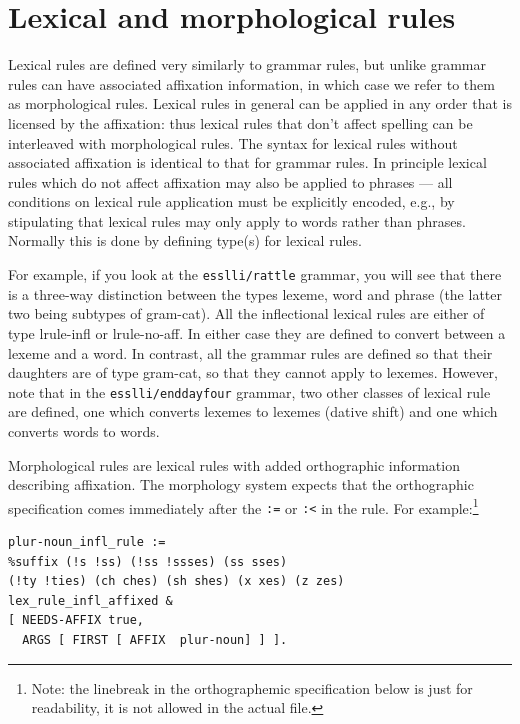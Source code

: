 \documentclass[12pt]{report}
\newcommand{\filename}[1]{{\tt #1}}
\begin{document}
\section{Lexical and morphological rules}
\label{lrules}

Lexical rules are defined very similarly to grammar rules, but 
unlike grammar rules can have associated affixation information,
in which case we refer to them as morphological rules.
Lexical rules in general can be applied in any order that is
licensed by the affixation: thus lexical rules that don't
affect spelling can be interleaved with morphological rules.
The syntax for lexical rules without associated affixation
is identical to that for grammar rules.
In principle
lexical rules which do not affect affixation
may also be applied to phrases ---
all conditions on lexical rule application must be explicitly encoded,
e.g., by stipulating that lexical rules may only apply
to {\type word}s rather than {\type phrase}s.
Normally this is done by defining type(s) for lexical rules.

For example, if you look at the \filename{esslli/rattle} 
grammar, you will see that
there is a three-way distinction between the types {\type lexeme},
{\type word} and {\type phrase} (the latter two being subtypes of
{\type gram-cat}).
All the inflectional lexical rules
are either of type {\type lrule-infl} or {\type lrule-no-aff}.  In either
case they are defined to convert between a {\type lexeme} and a {\type word}.
In contrast, all the grammar rules are defined so that their daughters
are of type {\type gram-cat}, so that they cannot apply to lexemes.
However, note that in the \filename{esslli/enddayfour} grammar, two other classes
of lexical rule are defined, one which converts {\type lexeme}s to 
{\type lexeme}s (dative shift) and one which converts {\type word}s to
{\type word}s.  

Morphological rules are lexical
rules with added orthographic
information describing affixation.
The morphology system expects that the
orthographic specification comes immediately after the 
{\tt :=} or {\tt :<} in the rule.
For example:\footnote{Note: the linebreak 
in the orthographemic specification below is just for readability,
it is not allowed in the actual file.}
\begin{verbatim}
plur-noun_infl_rule :=
%suffix (!s !ss) (!ss !ssses) (ss sses) 
(!ty !ties) (ch ches) (sh shes) (x xes) (z zes)
lex_rule_infl_affixed &
[ NEEDS-AFFIX true,
  ARGS [ FIRST [ AFFIX  plur-noun] ] ].
\end{verbatim}
\end{document}
